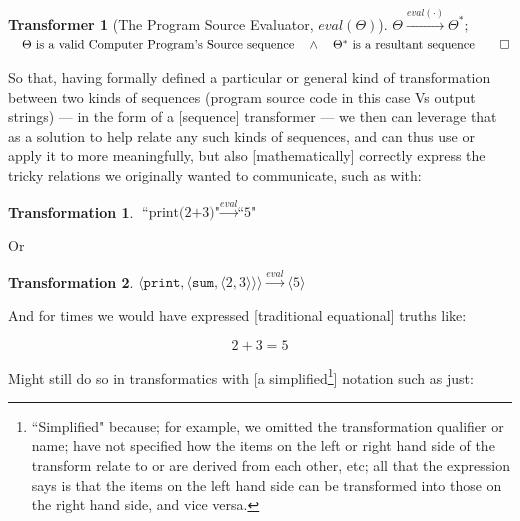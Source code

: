 \documentclass[a4paper, 18pt]{book} %
\newtheorem{trans}{Transformation}
\newtheorem{transf}{Transformer}
\begin{document}
\vspace{1em}
\begin{transf}[The Program Source Evaluator, $eval(\Theta)$]
$\Theta  \xrightarrow{eval(\cdot)} \Theta^*;$\\
$\quad \Theta \text{ is a valid Computer Program's Source sequence} \quad \land \quad \Theta^* \text{ is a resultant sequence} \qed$
\end{transf}
\vspace{1em}


So that, having formally defined a particular or general kind of transformation between two kinds of sequences (program source code in this case Vs output strings) --- in the form of a [sequence] transformer --- we then can leverage that as a solution to help relate any such kinds of sequences, and can thus use or apply it to more meaningfully, but also [mathematically] correctly express the tricky relations we originally wanted to communicate, such as with:

\vspace{1em}
\begin{trans}
$\text{``print(2+3)"} \xrightarrow{eval}\text{``5"}$
\end{trans}
\vspace{1em}
 
 
 Or


\vspace{1em}
\begin{trans}
$\langle \texttt{print}, \langle \texttt{sum}, \langle 2, 3 \rangle \rangle \rangle \xrightarrow{eval} \langle 5 \rangle$
\end{trans}
\vspace{1em}

And for times we would have expressed [traditional equational] truths like:


\vspace{1em}
\begin{equation}
2+3 = 5
\end{equation}
\vspace{1em}

Might still do so in transformatics with [a simplified\footnote{``Simplified" because; for example, we omitted the transformation qualifier or name; have not specified how the items on the left or right hand side of the transform relate to or are derived from each other, etc; all that the expression says is that the items on the left hand side can be transformed into those on the right hand side, and vice versa.}] notation such as just:
\end{document}
